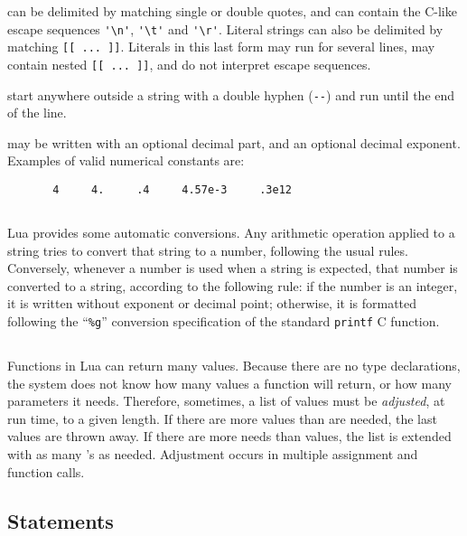 can be delimited by matching single or double quotes,
and can contain the C-like escape sequences
\verb-'\n'-, \verb-'\t'- and \verb-'\r'-.
Literal strings can also be delimited by matching \verb'[[ ... ]]'.
Literals in this last form may run for several lines,
may contain nested \verb'[[ ... ]]',
and do not interpret escape sequences.

 start anywhere outside a string with a
double hyphen (\verb'--') and run until the end of the line.

 may be written with an optional decimal part,
and an optional decimal exponent.
Examples of valid numerical constants are:
\begin{verbatim}
       4     4.     .4     4.57e-3     .3e12
\end{verbatim}


\subsection{} \label{coercion}

Lua provides some automatic conversions.
Any arithmetic operation applied to a string tries to convert
that string to a number, following the usual rules.
Conversely, whenever a number is used when a string is expected,
that number is converted to a string, according to the following rule:
if the number is an integer, it is written without exponent or decimal point;
otherwise, it is formatted following the ``\verb'%g'''
conversion specification of the standard \verb'printf' C function.



\subsection{} \label{adjust}

Functions in Lua can return many values.
Because there are no type declarations,
the system does not know how many values a function will return,
or how many parameters it needs.
Therefore, sometimes, a list of values must be {\em adjusted\/}, at run time,
to a given length.
If there are more values than are needed, the last values are thrown away.
If there are more needs than values, the list is extended with as
many  \nil's as needed.
Adjustment occurs in multiple assignment and function calls.


\subsection{Statements}

